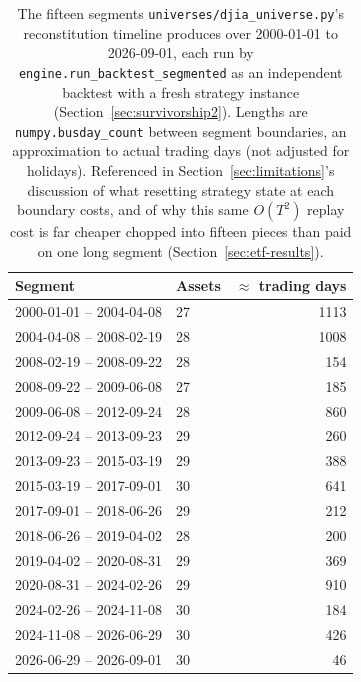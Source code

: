 \documentclass[11pt]{article}
\begin{document}
\begin{table}[h]
\centering
\begin{tabular}{llr}
\toprule
Segment & Assets & $\approx$ trading days \\
\midrule
2000-01-01 -- 2004-04-08 & 27 & 1113 \\
2004-04-08 -- 2008-02-19 & 28 & 1008 \\
2008-02-19 -- 2008-09-22 & 28 &  154 \\
2008-09-22 -- 2009-06-08 & 27 &  185 \\
2009-06-08 -- 2012-09-24 & 28 &  860 \\
2012-09-24 -- 2013-09-23 & 29 &  260 \\
2013-09-23 -- 2015-03-19 & 29 &  388 \\
2015-03-19 -- 2017-09-01 & 30 &  641 \\
2017-09-01 -- 2018-06-26 & 29 &  212 \\
2018-06-26 -- 2019-04-02 & 28 &  200 \\
2019-04-02 -- 2020-08-31 & 29 &  369 \\
2020-08-31 -- 2024-02-26 & 29 &  910 \\
2024-02-26 -- 2024-11-08 & 30 &  184 \\
2024-11-08 -- 2026-06-29 & 30 &  426 \\
2026-06-29 -- 2026-09-01 & 30 &   46 \\
\bottomrule
\end{tabular}
\caption{The fifteen segments \texttt{universes/djia\_universe.py}'s
reconstitution timeline produces over 2000-01-01 to 2026-09-01, each run
by \texttt{engine.run\_backtest\_segmented} as an independent backtest
with a fresh strategy instance (Section~\ref{sec:survivorship2}).
Lengths are \texttt{numpy.busday\_count} between segment boundaries, an
approximation to actual trading days (not adjusted for holidays).
Referenced in Section~\ref{sec:limitations}'s discussion of what
resetting strategy state at each boundary costs, and of why this same
$O(T^2)$ replay cost is far cheaper chopped into fifteen pieces than paid
on one long segment (Section~\ref{sec:etf-results}).}
\label{tab:djia-segments}
\end{table}
\end{document}
